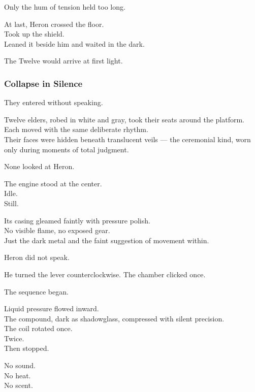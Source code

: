 \documentclass[12pt]{article}
\begin{document}
Only the hum of tension held too long.

\vspace{1em}

At last, Heron crossed the floor.\\
Took up the shield.\\
Leaned it beside him and waited in the dark.

\vspace{1em}

The Twelve would arrive at first light.

\dotfill

\subsubsection{Collapse in Silence}

They entered without speaking.

Twelve elders, robed in white and gray, took their seats around the platform.\\
Each moved with the same deliberate rhythm.\\
Their faces were hidden beneath translucent veils — the ceremonial kind, worn only during moments of total judgment.

None looked at Heron.

The engine stood at the center.\\
Idle.\\
Still.

Its casing gleamed faintly with pressure polish.\\
No visible flame, no exposed gear.\\
Just the dark metal and the faint suggestion of movement within.

Heron did not speak.

He turned the lever counterclockwise.  
The chamber clicked once.

\vspace{1em}

The sequence began.

Liquid pressure flowed inward.\\
The compound, dark as shadowglass, compressed with silent precision.\\
The coil rotated once.\\
Twice.\\
Then stopped.

No sound.\\
No heat.\\
No scent.
\end{document}
